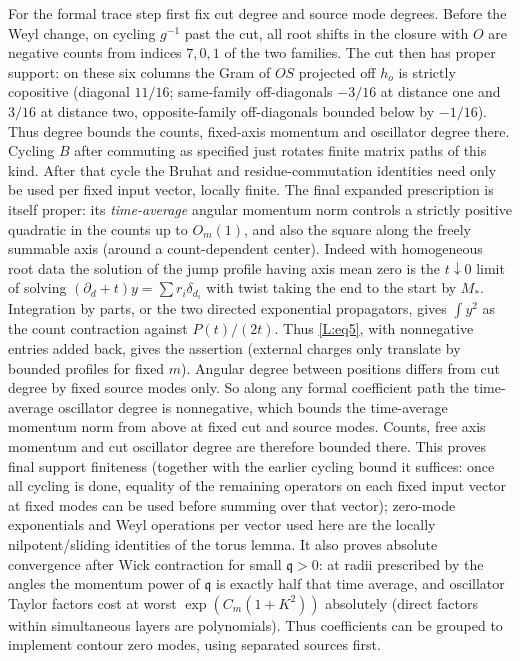 \documentclass[11pt]{article}
\numberwithin{equation}{section}
\theoremstyle{definition}\newtheorem{definition}[theorem]{Definition}
\theoremstyle{remark}\newtheorem{remark}[theorem]{Remark}
\begin{document}
For the formal trace step first fix cut degree and source mode degrees. Before the Weyl change, on cycling \(g^{-1}\) past the cut, all root shifts in the closure with \(O\) are negative counts from indices \(7,0,1\) of the two families. The cut then has proper support: on these six columns the Gram of \(OS\) projected off \(h_o\) is strictly copositive (diagonal \(11/16\); same-family off-diagonals \(-3/16\) at distance one and \(3/16\) at distance two, opposite-family off-diagonals bounded below by \(-1/16\)). Thus degree bounds the counts, fixed-axis momentum and oscillator degree there. Cycling \(B\) after commuting as specified just rotates finite matrix paths of this kind. After that cycle the Bruhat and residue-commutation identities need only be used per fixed input vector, locally finite. The final expanded prescription is itself proper: its \emph{time-average} angular momentum norm controls a strictly positive quadratic in the counts up to \(O_m(1)\), and also the square along the freely summable axis (around a count-dependent center). Indeed with homogeneous root data the solution of the jump profile having axis mean zero is the \(t\downarrow0\) limit of solving \((\partial_d+t)y=\sum r_i\delta_{d_i}\) with twist taking the end to the start by \(M_*\). Integration by parts, or the two directed exponential propagators, gives \(\int y^2\) as the count contraction against \(P(t)/(2t)\). Thus \eqref{L:eq5}, with nonnegative entries added back, gives the assertion (external charges only translate by bounded profiles for fixed \(m\)). Angular degree between positions differs from cut degree by fixed source modes only. So along any formal coefficient path the time-average oscillator degree is nonnegative, which bounds the time-average momentum norm from above at fixed cut and source modes. Counts, free axis momentum and cut oscillator degree are therefore bounded there. This proves final support finiteness (together with the earlier cycling bound it suffices: once all cycling is done, equality of the remaining operators on each fixed input vector at fixed modes can be used before summing over that vector); zero-mode exponentials and Weyl operations per vector used here are the locally nilpotent/sliding identities of the torus lemma. It also proves absolute convergence after Wick contraction for small \(\mathfrak q>0\): at radii prescribed by the angles the momentum power of \(\mathfrak q\) is exactly half that time average, and oscillator Taylor factors cost at worst \(\exp(C_m(1+K^2))\) absolutely (direct factors within simultaneous layers are polynomials). Thus coefficients can be grouped to implement contour zero modes, using separated sources first.
\end{document}
